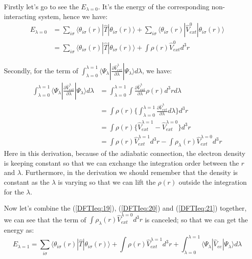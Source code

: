 Firstly let's go to see the $E_{\lambda = 0}$. It's the energy of
the corresponding non-interacting system, hence we have:
\begin{align}\label{DFTIeq:20}
E_{\lambda = 0} &=\sum_{i\sigma}
\langle\theta_{i\sigma}(r)|\hat{T}|\theta_{i\sigma}(r)\rangle +
\sum_{i\sigma}
\langle\theta_{i\sigma}(r)|\hat{V}^{0}_{ext}|\theta_{i\sigma}(r)\rangle
\nonumber \\
&= \sum_{i\sigma}
\langle\theta_{i\sigma}(r)|\hat{T}|\theta_{i\sigma}(r)\rangle + \int
\rho(r)\hat{V}^{0}_{ext}d^{3}r
\end{align}

Secondly, for the term of $\int^{\lambda = 1}_{\lambda =
0}\langle\Psi_{\lambda}|\frac{\partial
\hat{V}^{\lambda}_{ext}}{\partial \lambda} |\Psi_{\lambda}\rangle
d\lambda$, we have:
\begin{align}\label{DFTIeq:21}
\int^{\lambda = 1}_{\lambda = 0}\langle\Psi_{\lambda}|\frac{\partial
\hat{V}^{\lambda}_{ext}}{\partial \lambda} |\Psi_{\lambda}\rangle
d\lambda &= \int^{\lambda = 1}_{\lambda = 0}\int\frac{\partial
\hat{V}^{\lambda}_{ext}}{\partial \lambda}\rho(r)d^{3}r
d\lambda \nonumber \\
&=\int\rho(r)\Big\{\int^{\lambda = 1}_{\lambda = 0}\frac{\partial
\hat{V}^{\lambda}_{ext}}{\partial
\lambda}d\lambda\Big\}d^{3}r \nonumber \\
&=\int\rho(r)\Big\{ \hat{V}^{\lambda=1}_{ext} -
\hat{V}^{\lambda=0}_{ext}\Big\}d^{3}r
\nonumber \\
&=\int\rho(r)\hat{V}^{\lambda=1}_{ext}d^{3}r -
\int\rho_{\lambda}(r)\hat{V}^{\lambda=0}_{ext}d^{3}r
\end{align}
Here in this derivation, because of the adiabatic connection, the
electron density is keeping constant so that we can exchange the
integration order between the $r$ and $\lambda$. Furthermore, in the
derivation we should remember that the density is constant as the
$\lambda$ is varying so that we can lift the $\rho(r)$ outside the
integration for the $\lambda$.

Now let's combine the (\ref{DFTIeq:19}), (\ref{DFTIeq:20}) and
(\ref{DFTIeq:21}) together, we can see that the term of
$\int\rho_{\lambda}(r)\hat{V}^{\lambda=0}_{ext}d^{3}r$ is canceled;
so that we can get the energy as:
\begin{equation}\label{DFTIeq:22}
E_{\lambda = 1} = \sum_{i\sigma}
\langle\theta_{i\sigma}(r)|\hat{T}|\theta_{i\sigma}(r)\rangle +
\int\rho(r)\hat{V}^{\lambda=1}_{ext}d^{3}r + \int^{\lambda =
1}_{\lambda = 0}\langle\Psi_{\lambda}|\hat{V}_{ee}
|\Psi_{\lambda}\rangle d\lambda
\end{equation}

